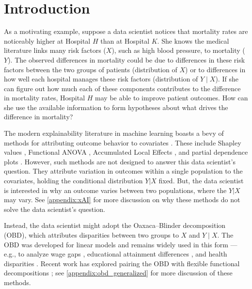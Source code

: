 \section{Introduction}
\label{sec:intro}
As a motivating example, suppose a data scientist notices that mortality rates are noticeably higher at Hospital $H$ than at Hospital $K$.
She knows the medical literature links many risk factors ($X$), such as high blood pressure, to mortality ($Y$).
The observed differences in mortality could be due to differences in these risk factors between the two groups of patients (distribution of $X$) or to differences in how well each hospital manages these risk factors (distribution of $Y \mid X$).
If she can figure out how much each of these components contributes to the difference in mortality rates, Hospital $H$ may be able to improve patient outcomes.
How can she use the available information to form hypotheses about what drives the difference in mortality?

The modern explainability literature in machine learning boasts a bevy of methods for attributing outcome behavior to covariates \citep{Dwivedi2023}.
These include Shapley values \citep{Shapley1953, Lundberg2017, chen2025shapley}, Functional ANOVA \citep{stone1994, hooker2004discovering, hookerGeneralizedFunctionalANOVA2007, lengerich2020purifying, fumagalli2025fanova}, Accumulated Local Effects \citep{apley2020}, and partial dependence plots \citep{friedman2001greedy, liu2025trees}.
However, such methods are not designed to answer this data scientist's question.
They attribute variation in outcomes within a single population to the covariates, holding the conditional distribution $Y | X$ fixed.
But, the data scientist is interested in why an outcome varies between two populations, where the $Y | X$ may vary.
See \cref{appendix:xAI} for more discussion on why these methods do not solve the data scientist's question.

Instead, the data scientist might adopt the Oaxaca--Blinder decomposition (OBD), which attributes disparities between two groups to $X$ and $Y \mid X$. 
The OBD was developed for linear models \citep{oaxaca1973,blinder1973} and remains widely used in this form --- e.g., to analyze wage gaps \citep{paradaContzen2025}, educational attainment differences \citep{barhaim2023}, and health disparities \citep{cartwright2021,elder2026political}. Recent work has explored pairing the OBD with flexible functional decompositions \citep{quintero2025,bach2024heterogeneity,quintas2024multiply,mao2025double,flachaire2025decomposing}; see \cref{appendix:obd_generalized} for more discussion of these methods.

